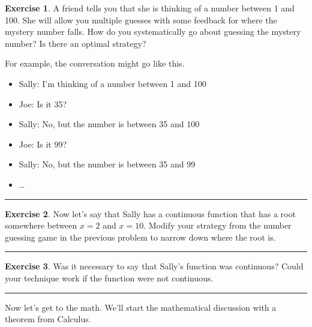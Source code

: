 \documentclass[
]{book}
\providecommand{\tightlist}{%
  \setlength{\itemsep}{0pt}\setlength{\parskip}{0pt}}
\theoremstyle{definition}
\theoremstyle{definition}
\theoremstyle{definition}
\newtheorem{exercise}{Exercise}[chapter]
\theoremstyle{remark}
\begin{document}
\begin{exercise}
\protect\hypertarget{exr:bisection1}{}{\label{exr:bisection1} }A friend tells you that she is thinking of a number between 1 and 100. She will allow you multiple guesses with some feedback for where the mystery number falls. How do you systematically go about guessing the mystery number? Is there an optimal strategy?

For example, the conversation might go like this.

\begin{itemize}
\tightlist
\item
  Sally: I'm thinking of a number between 1 and 100
\item
  Joe: Is it 35?
\item
  Sally: No, but the number is between 35 and 100
\item
  Joe: Is it 99?
\item
  Sally: No, but the number is between 35 and 99
\item
  \ldots{}
\end{itemize}
\end{exercise}

\begin{center}\rule{0.5\linewidth}{0.5pt}\end{center}

\begin{exercise}
\protect\hypertarget{exr:bisection2}{}{\label{exr:bisection2} }Now let's say that Sally has a continuous function that has a root somewhere between \(x=2\) and \(x=10\). Modify your strategy from the number guessing game in the previous problem to narrow down where the root is.
\end{exercise}

\begin{center}\rule{0.5\linewidth}{0.5pt}\end{center}

\begin{exercise}
\protect\hypertarget{exr:unnamed-chunk-70}{}{\label{exr:unnamed-chunk-70} }Was it necessary to say that Sally's function was continuous? Could your technique work if the function were not continuous.
\end{exercise}

\begin{center}\rule{0.5\linewidth}{0.5pt}\end{center}

Now let's get to the math. We'll start the mathematical discussion with a theorem from Calculus.
\end{document}
